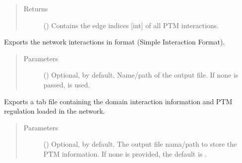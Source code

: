 \documentclass[letterpaper,10pt,english]{sphinxmanual}
\begin{document}
\begin{fulllineitems}
\begin{fulllineitems}
\begin{quote}
\begin{description}
\item[{Returns}] \leavevmode
() \textendash{} Contains the edge indices {[}int{]} of all PTM
interactions.

\end{description}\end{quote}

\end{fulllineitems}


\begin{fulllineitems}
\label{\detokenize{main:pypath.main.PyPath.export_sif}}
Exports the network interactions in  format (Simple
Interaction Format).
\begin{quote}\begin{description}
\item[{Parameters}] \leavevmode
{} () \textendash{} Optional,  by default. Name/path of the output file.
If none is passed, 
is used.

\end{description}\end{quote}

\end{fulllineitems}


\begin{fulllineitems}
\label{\detokenize{main:pypath.main.PyPath.export_struct_tab}}
Exports a tab file containing the domain interaction information
and PTM regulation loaded in the network.
\begin{quote}\begin{description}
\item[{Parameters}] \leavevmode
{} () \textendash{} Optional,  by default. The output file nama/path to
store the PTM information. If none is provided, the default
is .


\end{description}
\end{quote}
\end{fulllineitems}
\end{fulllineitems}
\end{document}
